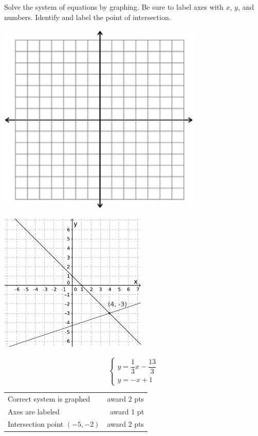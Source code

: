 {
	Solve the system of equations by graphing. Be sure to label axes with $x$, $y$, and numbers. Identify and label the point of intersection. \begin{onlyproblem}\begin{center}\includegraphics{fig-graphpaper.png}\end{center}\end{onlyproblem} \begin{onlysolution}\begin{center}\includegraphics{fig095-10-5-d-answer}\end{center}\end{onlysolution}
	$$\begin{cases} y=\dfrac{1}{3}x-\dfrac{13}{3}\\ y=-x+1\end{cases}$$
}
{
	\begin{tabular}{l r}
	Correct system is graphed & award 2 pts\\
	Axes are labeled & award 1 pt\\
	Intersection point $(-5,-2)$ & award 2 pts
	\end{tabular}
}
